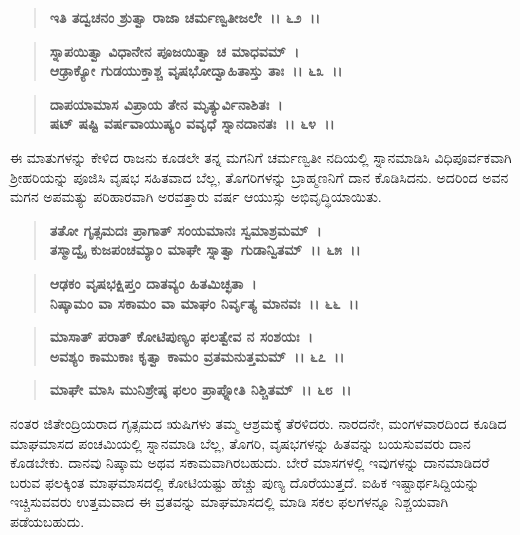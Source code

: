 \begin{verse}
\textbf{ಇತಿ ತದ್ವಚನಂ ಶ್ರುತ್ವಾ ರಾಜಾ ಚರ್ಮಣ್ವತೀಜಲೇ~।। ೬೨~।।} 
\end{verse}

\begin{verse}
\textbf{ಸ್ನಾಪಯಿತ್ವಾ ವಿಧಾನೇನ ಪೂಜಯಿತ್ವಾ ಚ ಮಾಧವಮ್~।}\\\textbf{ಆಢ್ರಾಕ್ಯೋ ಗುಡಯುಕ್ತಾಶ್ಚ ವೃಷಭೋದ್ವಾಹಿತಾಸ್ತು ತಾಃ~।। ೬೩~।। }
\end{verse}

\begin{verse}
\textbf{ದಾಪಯಾಮಾಸ ವಿಪ್ರಾಯ ತೇನ ಮೃತ್ಯುರ್ವಿನಾಶಿತಃ~।}\\\textbf{ಷಟ್ ಷಷ್ಟಿ ವರ್ಷವಾಯುಷ್ಯಂ ವವೃಧೆ ಸ್ನಾನದಾನತಃ~।। ೬೪~।।}
\end{verse}

ಈ ಮಾತುಗಳನ್ನು ಕೇಳಿದ ರಾಜನು ಕೂಡಲೇ ತನ್ನ ಮಗನಿಗೆ ಚರ್ಮಣ್ವತೀ ನದಿಯಲ್ಲಿ ಸ್ನಾನಮಾಡಿಸಿ ವಿಧಿಪೂರ್ವಕವಾಗಿ ಶ‍್ರೀಹರಿಯನ್ನು ಪೂಜಿಸಿ ವೃಷಭ ಸಹಿತವಾದ ಬೆಲ್ಲ, ತೊಗರಿಗಳನ್ನು ಬ್ರಾಹ್ಮಣನಿಗೆ ದಾನ ಕೊಡಿಸಿದನು. ಅದರಿಂದ ಅವನ ಮಗನ ಅಪಮತ್ಯು ಪರಿಹಾರವಾಗಿ ಅರವತ್ತಾರು ವರ್ಷ ಆಯುಸ್ಸು ಅಭಿವೃದ್ಧಿಯಾಯಿತು.

\begin{verse}
\textbf{ತತೋ ಗೃತ್ಸಮದಃ ಪ್ರಾಗಾತ್ ಸಂಯಮಾನಃ ಸ್ವಮಾಶ್ರಮಮ್~।}\\\textbf{ತಸ್ಮಾದ್ವೈ ಕುಜಪಂಚಮ್ಯಾಂ ಮಾಘೇ ಸ್ನಾತ್ವಾ ಗುಡಾನ್ವಿತಮ್~।। ೬೫~।। }
\end{verse}

\begin{verse}
\textbf{ಆಢಕಂ ವೃಷಭಕ್ಷಿಪ್ತಂ ದಾತವ್ಯಂ ಹಿತಮಿಚ್ಛತಾ~।}\\\textbf{ನಿಷ್ಕಾಮಂ ವಾ ಸಕಾಮಂ ವಾ ಮಾಘಂ ನಿರ್ವೃತ್ಯ ಮಾನವಃ~।। ೬೬~।।} 
\end{verse}

\begin{verse}
\textbf{ಮಾಸಾತ್ ಪರಾತ್ ಕೋಟಿಪುಣ್ಯಂ ಫಲತ್ವೇವ ನ ಸಂಶಯಃ~।}\\\textbf{ಅವಶ್ಯಂ ಕಾಮುಕಾಃ ಕೃತ್ವಾ ಕಾಮಂ ವ್ರತಮನುತ್ತಮಮ್~।। ೬೭~।।} 
\end{verse}

\begin{verse}
\textbf{ಮಾಘೇ ಮಾಸಿ ಮುನಿಶ್ರೇಷ್ಠ ಫಲಂ ಪ್ರಾಪ್ನೋತಿ ನಿಶ್ಚಿತಮ್~।। ೬೮~।।}
\end{verse}

ನಂತರ ಜಿತೇಂದ್ರಿಯರಾದ ಗೃತ್ಸಮದ ಋಷಿಗಳು ತಮ್ಮ ಆಶ್ರಮಕ್ಕೆ ತೆರಳಿದರು. ನಾರದನೇ, ಮಂಗಳವಾರದಿಂದ ಕೂಡಿದ ಮಾಘಮಾಸದ ಪಂಚಮಿಯಲ್ಲಿ ಸ್ನಾನಮಾಡಿ ಬೆಲ್ಲ, ತೊಗರಿ, ವೃಷಭಗಳನ್ನು ಹಿತವನ್ನು ಬಯಸುವವರು ದಾನ ಕೊಡಬೇಕು. ದಾನವು ನಿಷ್ಕಾಮ ಅಥವ ಸಕಾಮವಾಗಿರಬಹುದು. ಬೇರೆ ಮಾಸಗಳಲ್ಲಿ ಇವುಗಳನ್ನು ದಾನಮಾಡಿದರೆ ಬರುವ ಫಲಕ್ಕಿಂತ ಮಾಘಮಾಸದಲ್ಲಿ ಕೋಟಿಯಷ್ಟು ಹೆಚ್ಚು ಪುಣ್ಯ ದೊರೆಯುತ್ತದೆ. ಐಹಿಕ ಇಷ್ಟಾರ್ಥಸಿದ್ದಿಯನ್ನು ಇಚ್ಚಿಸುವವರು ಉತ್ತಮವಾದ ಈ ವ್ರತವನ್ನು ಮಾಘಮಾಸದಲ್ಲಿ ಮಾಡಿ ಸಕಲ ಫಲಗಳನ್ನೂ ನಿಶ್ಚಯವಾಗಿ ಪಡೆಯಬಹುದು.

